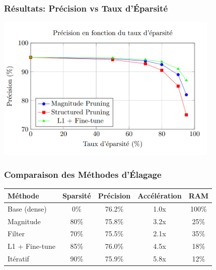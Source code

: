 \documentclass[10pt]{beamer}
\begin{document}
\begin{frame}
\frametitle{Résultats: Précision vs Taux d'Éparsité}
\begin{center}
\includegraphics[width=0.8\textwidth]{accuracy_vs_sparsity.png}
\end{center}
\end{frame}

\begin{frame}
\frametitle{Comparaison des Méthodes d'Élagage}
\begin{center}
\begin{tabular}{lcccc}
\toprule
\textbf{Méthode} & \textbf{Sparsité} & \textbf{Précision} & \textbf{Accélération} & \textbf{RAM} \\
\midrule
Base (dense) & 0\% & 76.2\% & 1.0x & 100\% \\
Magnitude & 80\% & 75.8\% & 3.2x & 25\% \\
Filter & 70\% & 75.5\% & 2.1x & 35\% \\
L1 + Fine-tune & 85\% & 76.0\% & 4.5x & 18\% \\
Itératif & 90\% & 75.9\% & 5.8x & 12\% \\
\bottomrule
\end{tabular}
\end{center}
\end{frame}
\end{document}
